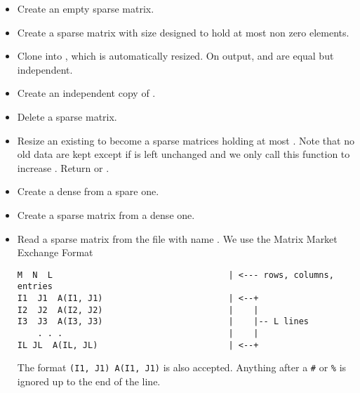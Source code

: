 \begin{itemize}
\item {}
  \sshortdescribe Create an empty sparse matrix.
\item {}
  \sshortdescribe Create a sparse matrix with size  designed to
  hold at most  non zero elements.
\item {}
  \sshortdescribe Clone  into , which is automatically
  resized. On output,  and  are equal but independent.
\item {}
  \sshortdescribe Create an independent copy of .
\item {}
  \sshortdescribe Delete a sparse matrix.
\item {}
  \sshortdescribe Resize an existing \PnlSpMat to become a  sparse
  matrices holding at most . Note that no old data are kept except if
   is left unchanged and we only call this function to increase
  . Return  or .
\item {}
  \sshortdescribe Create a dense \PnlMat from a spare one.
\item {}
  \sshortdescribe Create a sparse matrix from a dense one.
\item {}
  \sshortdescribe Read a sparse matrix from the file with name . We use the Matrix Market Exchange Format
  \begin{verbatim}
M  N  L                                   | <--- rows, columns, entries
I1  J1  A(I1, J1)                         | <--+
I2  J2  A(I2, J2)                         |    |
I3  J3  A(I3, J3)                         |    |-- L lines
    . . .                                 |    |
IL JL  A(IL, JL)                          | <--+
  \end{verbatim}
  The format \verb!(I1, J1) A(I1, J1)! is also accepted. Anything after a \verb!#! or \verb!%! is ignored up to the end of the line.
\end{itemize}

